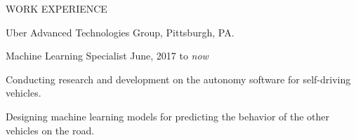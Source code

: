 \documentclass{resume} %
\begin{document}

\begin{rSection}{WORK EXPERIENCE}

\begin{rSubsection}{\hspace{-1em} Uber Advanced Technologies Group, Pittsburgh, PA.}{}{}{}
\vspace{-0.3em}
\item[] \hspace{-2em} Machine Learning Specialist \hfill June, 2017 to \emph{now}
\item Conducting research and development on the autonomy software for self-driving vehicles.
\item Designing machine learning models for predicting the behavior of the other vehicles on the road.
\end{rSubsection}
\end{rSection}
\vspace{-.15in}
\end{document}

